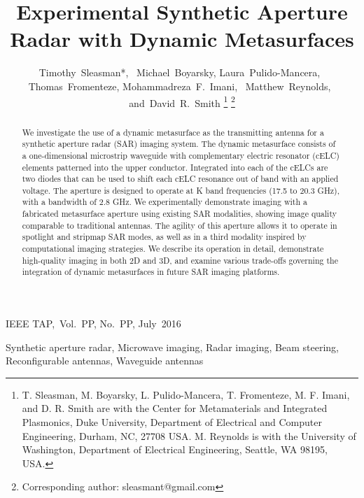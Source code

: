 \documentclass[journal]{IEEEtran}
\begin{document}
\title{Experimental Synthetic Aperture Radar with Dynamic Metasurfaces}

\author{Timothy~Sleasman*,~%
	Michael~Boyarsky,
	Laura~Pulido-Mancera,~%
	Thomas~Fromenteze,
	Mohammadreza~F.~Imani,~%
	Matthew~Reynolds,~%
	and~David~R.~Smith%
\thanks{T. Sleasman, M. Boyarsky, L. Pulido-Mancera, T. Fromenteze, M. F. Imani, and D. R. Smith are with the Center for Metamaterials and Integrated Plasmonics, Duke University, Department of Electrical and Computer Engineering, Durham, NC, 27708 USA. M. Reynolds is with the University of Washington, Department of Electrical Engineering, Seattle, WA 98195, USA.}%
\thanks{Corresponding author: sleasmant@gmail.com}}


%
{IEEE TAP,~Vol.~PP, No.~PP, July~2016}


\maketitle

\begin{abstract}
We investigate the use of a dynamic metasurface as the transmitting antenna for a synthetic aperture radar (SAR) imaging system. The dynamic metasurface consists of a one-dimensional microstrip waveguide with complementary electric resonator (cELC) elements patterned into the upper conductor. Integrated into each of the cELCs are two diodes that can be used to shift each cELC resonance out of band with an applied voltage. The aperture is designed to operate at K band frequencies (17.5 to 20.3 GHz), with a bandwidth of 2.8 GHz. We experimentally demonstrate imaging with a fabricated metasurface aperture using existing SAR modalities, showing image quality comparable to traditional antennas. The agility of this aperture allows it to operate in spotlight and stripmap SAR modes, as well as in a third modality inspired by computational imaging strategies. We describe its operation in detail, demonstrate high-quality imaging in both 2D and 3D, and examine various trade-offs governing the integration of dynamic metasurfaces in future SAR imaging platforms.
\end{abstract}


\begin{IEEEkeywords}
Synthetic aperture radar, Microwave imaging, Radar imaging, Beam steering, Reconfigurable antennas, Waveguide antennas
\end{IEEEkeywords}
\end{document}
